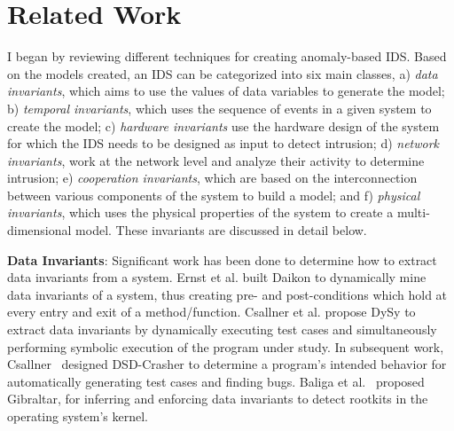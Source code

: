 
\chapter{Related Work}
\label{ch:RelatedWork}

I began by reviewing different techniques for creating anomaly-based \ac{IDS}. Based on the models created, an \ac{IDS} can be categorized into six main classes, a) \textit{data invariants}, which aims to use the values of data variables to generate the model; b) \textit{temporal invariants}, which uses the sequence of events in a given system to create the model; c) \textit{hardware invariants} use the hardware design of the system for which the \ac{IDS} needs to be designed as input to detect intrusion; d) \textit{network invariants}, work at the network level and analyze their activity to determine intrusion; e) \textit{cooperation invariants}, which are based on the interconnection between various components of the system to build a model; and f) \textit{physical invariants}, which uses the physical properties of the system to create a multi-dimensional model. These invariants are discussed in detail below.

\textbf{Data Invariants}: Significant work \cite{ernst2007daikon, csallner2008dysy, baliga2008automatic, baliga2011detecting, csallner2008dsd} has been done to determine how to extract data invariants from a system. Ernst et al. \cite{ernst2007daikon} built Daikon to dynamically mine data invariants of a system, thus creating pre- and post-conditions which hold at every entry and exit of a method/function.  Csallner et al. \cite{csallner2008dysy} propose DySy to extract data invariants by dynamically executing test cases and simultaneously performing symbolic execution of the program under study. In subsequent work, Csallner~\cite{csallner2008dsd} designed DSD-Crasher to determine a program's intended behavior for automatically generating test cases and finding bugs.
Baliga et al.~\cite{baliga2008automatic, baliga2011detecting} proposed Gibraltar, for inferring and enforcing data invariants to detect rootkits in the operating system's kernel.  

